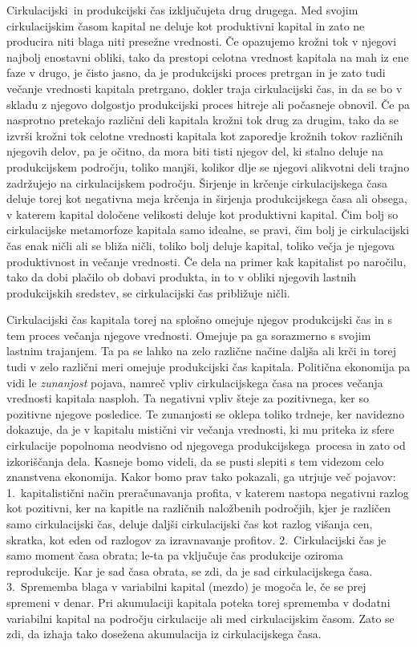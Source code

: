 \documentclass[kapital_02.tex]{subfiles}
\begin{document}
Cirkulacijski\KPEstran\ in produkcijski čas izključujeta drug drugega.
Med svojim cirkulacijskim časom kapital ne deluje kot produktivni kapital in zato ne producira niti blaga niti presežne vrednosti.
Če opazujemo krožni tok v njegovi najbolj enostavni obliki, tako da prestopi celotna vrednost kapitala na mah iz ene faze v drugo, je čisto jasno, da je produkcijski proces pretrgan in je zato tudi večanje vrednosti kapitala pretrgano, dokler traja cirkulacijski čas, in da se bo v skladu z njegovo dolgostjo produkcijski proces hitreje ali počasneje obnovil.
Če pa nasprotno pretekajo različni deli kapitala krožni tok drug za drugim, tako da se izvrši krožni tok celotne vrednosti kapitala kot zaporedje krožnih tokov različnih njegovih delov, pa je očitno, da mora biti tisti njegov del, ki stalno deluje na produkcijskem področju, toliko manjši, kolikor dlje se njegovi alikvotni deli trajno zadržujejo na cirkulacijskem področju.
Širjenje in krčenje cirkulacijskega časa deluje torej kot negativna meja krčenja in širjenja produkcijskega časa ali obsega, v katerem kapital določene velikosti deluje kot produktivni kapital.
Čim bolj so cirkulacijske metamorfoze kapitala samo idealne, se pravi, čim bolj je cirkulacijski čas enak ničli ali se bliža ničli, toliko bolj deluje kapital, toliko večja je njegova produktivnost in večanje vrednosti.
Če dela na primer kak kapitalist po naročilu, tako da dobi plačilo ob dobavi produkta, in to v obliki njegovih lastnih produkcijskih sredstev, se cirkulacijski čas približuje ničli.

Cirkulacijski čas kapitala torej na splošno omejuje njegov produkcijski čas in s tem proces večanja njegove vrednosti.
Omejuje pa ga sorazmerno s svojim lastnim trajanjem.
Ta pa se lahko na zelo različne načine daljša ali krči in torej tudi v zelo različni meri omejuje produkcijski čas kapitala.
Politična ekonomija pa vidi le \emph{zunanjost} pojava, namreč vpliv cirkulacijskega časa na proces večanja vrednosti kapitala nasploh.
Ta negativni vpliv šteje za pozitivnega, ker so pozitivne njegove posledice.
Te zunanjosti se oklepa toliko trdneje, ker navidezno dokazuje, da je v kapitalu mistični vir večanja vrednosti, ki mu priteka iz sfere cirkulacije popolnoma neodvisno od njegovega produkcijskega\KPEstran\ procesa in zato od izkoriščanja dela.
Kasneje bomo videli, da se pusti slepiti s tem videzom celo znanstvena ekonomija.
Kakor bomo prav tako pokazali, ga utrjuje več pojavov: 1.\ kapitalistični način preračunavanja profita, v katerem nastopa negativni razlog kot pozitivni, ker na kapitle na različnih naložbenih področjih, kjer je različen samo cirkulacijski čas, deluje daljši cirkulacijski čas kot razlog višanja cen, skratka, kot eden od razlogov za izravnavanje profitov.
2.\ Cirkulacijski čas je samo moment časa obrata; le-ta pa vključuje čas produkcije oziroma reprodukcije.
Kar je sad časa obrata, se zdi, da je sad cirkulacijskega časa.
3.\ Sprememba blaga v variabilni kapital (mezdo) je mogoča le, če se prej spremeni v denar.
Pri akumulaciji kapitala poteka torej sprememba v dodatni variabilni kapital na področju cirkulacije ali med cirkulacijskim časom.
Zato se zdi, da izhaja tako dosežena akumulacija iz cirkulacijskega časa.
\end{document}

